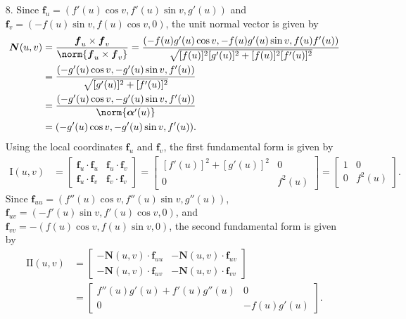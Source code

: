 \documentclass[a4paper,12pt]{article}
\newcommand{\bs}{\boldsymbol}
\theoremstyle{remark}
\begin{document}
\begin{enumerate}
    \item[8.]
        Since $\bs{f}_u = (f'(u) \cos v, f'(u) \sin v, g'(u))$ and $\bs{f}_v = (-f(u) \sin v, f(u) \cos v, 0)$, the unit normal vector is given by
        \begin{align*}
            \bs{N}(u, v) &= \frac{\bs{f}_u \times \bs{f}_v}{\norm{\bs{f}_u \times \bs{f}_v}} = \frac{(-f(u) g'(u) \cos v, -f(u) g'(u) \sin v, f(u) f'(u))}{\sqrt{[f(u)]^2 [g'(u)]^2 + [f(u)]^2 [f'(u)]^2}} \\
            &= \frac{(-g'(u) \cos v, -g'(u) \sin v, f'(u))}{\sqrt{[g'(u)]^2 + [f'(u)]^2}} \\
            &= \frac{(-g'(u) \cos v, -g'(u) \sin v, f'(u))}{\norm{\bs{\alpha}'(u)}} \\
            &= (-g'(u) \cos v, -g'(u) \sin v, f'(u)).
        \end{align*}
        Using the local coordinates $\bs{f}_u$ and $\bs{f}_v$, the first fundamental form is given by
        \begin{align*}
            \mathrm{I}(u, v) &= \left[ \begin{array}{cc}
                    \bs{f}_u \cdot \bs{f}_u & \bs{f}_u \cdot \bs{f}_v \\
                    \bs{f}_u \cdot \bs{f}_v & \bs{f}_v \cdot \bs{f}_v
            \end{array} \right]
            = \left[ \begin{array}{cc}
                    [f'(u)]^2 + [g'(u)]^2 & 0 \\
                    0 & f^2(u)
            \end{array} \right]
            = \left[ \begin{array}{cc}
                    1 & 0 \\
                    0 & f^2(u)
            \end{array} \right].
        \end{align*}
        Since $\bs{f}_{uu} = (f''(u) \cos v, f''(u) \sin v, g''(u))$, $\bs{f}_{uv} = (-f'(u) \sin v, f'(u) \cos v, 0)$, and $\bs{f}_{vv} = -(f(u) \cos v, f(u) \sin v, 0)$, the second fundamental form is given by
        \begin{align*}
            \mathrm{I\!I}(u, v) &= \left[ \begin{array}{cc}
                    -\bs{N}(u, v) \cdot \bs{f}_{uu} & -\bs{N}(u, v) \cdot \bs{f}_{uv} \\
                    -\bs{N}(u, v) \cdot \bs{f}_{uv} & -\bs{N}(u, v) \cdot \bs{f}_{vv}
            \end{array} \right] \\
            &= \left[ \begin{array}{cc}
                    f''(u) g'(u) + f'(u) g''(u) & 0 \\
                    0 & -f(u) g'(u)
            \end{array} \right].
        \end{align*}


\end{enumerate}
\end{document}
